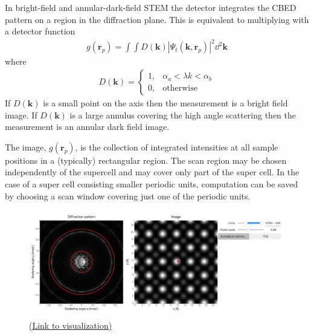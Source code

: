 \documentclass[%
 superscriptaddress,
 aip,
 amsmath,amssymb,
preprint,%
 author-year,%
longbibliography
]{revtex4-2}
\begin{document}
In bright-field and annular-dark-field STEM the detector integrates the CBED pattern on a region in the diffraction plane. This is equivalent to multiplying with a detector function
\begin{align*}
    g(\bm{r}_p) = \int\int D(\bm{k}) |\Psi_t(\bm{k}, \bm{r}_p)|^2 \dd^2 \bm{k}
\end{align*}
where 
\begin{align*}
    D(\bm{k}) = 
    \begin{cases}
    1, &  \alpha_a < \lambda k < \alpha_b \\
    0,              & \text{otherwise}
    \end{cases}
\end{align*}
If $D(\bm{k})$ is a small point on the axis then the measurement is a bright field image. If $D(\bm{k})$ is a large annulus covering the high angle scattering then the measurement is an annular dark field image.

The image, $g(\bm{r}_p)$, is the collection of integrated intensities at all sample positions in a (typically) rectangular region. The scan region may be chosen independently of the supercell and may cover only part of the super cell. In the case of a super cell consisting smaller periodic units, computation can be saved by choosing a scan window covering just one of the periodic units.

\begin{figure}[h]
    \includegraphics[width=1\textwidth]{figures/annular_integrals.png}
    \caption{ \href{https://boiling-wildwood-85903.herokuapp.com/voila/render/annular_detector.ipynb}{(Link to visualization)}}
    \label{vis:annular}
\end{figure}




\end{document}
